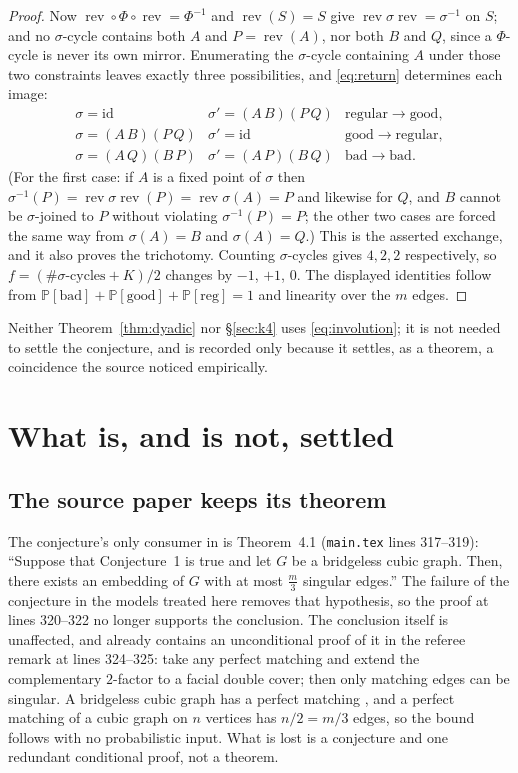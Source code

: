 \documentclass[11pt]{amsart}
\begin{document}
\begin{proof}
Now $\operatorname{rev}\circ\Phi\circ\operatorname{rev}=\Phi^{-1}$ and
$\operatorname{rev}(S)=S$ give
$\operatorname{rev}\sigma\operatorname{rev}=\sigma^{-1}$ on $S$; and no
$\sigma$-cycle contains both $A$ and $P=\operatorname{rev}(A)$, nor both $B$
and $Q$, since a $\Phi$-cycle is never its own mirror. Enumerating the
$\sigma$-cycle containing $A$ under those two constraints leaves exactly three
possibilities, and \eqref{eq:return} determines each image:
\[
\begin{array}{lll}
 \sigma=\mathrm{id}       & \sigma'=(A\,B)(P\,Q) & \text{regular}\to\text{good},\\
 \sigma=(A\,B)(P\,Q)     & \sigma'=\mathrm{id}   & \text{good}\to\text{regular},\\
 \sigma=(A\,Q)(B\,P)     & \sigma'=(A\,P)(B\,Q) & \text{bad}\to\text{bad}.
\end{array}
\]
(For the first case: if $A$ is a fixed point of $\sigma$ then
$\sigma^{-1}(P)=\operatorname{rev}\sigma\operatorname{rev}(P)
=\operatorname{rev}\sigma(A)=P$ and likewise for $Q$, and $B$ cannot be
$\sigma$-joined to $P$ without violating $\sigma^{-1}(P)=P$; the other two
cases are forced the same way from $\sigma(A)=B$ and $\sigma(A)=Q$.) This is
the asserted exchange, and it also proves the trichotomy. Counting
$\sigma$-cycles gives $4,2,2$ respectively, so
$f=(\#\sigma\text{-cycles}+K)/2$ changes by $-1$, $+1$, $0$. The displayed
identities follow from
$\mathbb{P}[\mathrm{bad}]+\mathbb{P}[\mathrm{good}]+\mathbb{P}[\mathrm{reg}]=1$
and linearity over the $m$ edges.
\end{proof}

Neither Theorem~\ref{thm:dyadic} nor \S\ref{sec:k4} uses
\eqref{eq:involution}; it is not needed to settle the conjecture, and is
recorded only because it settles, as a theorem, a coincidence the source
noticed empirically.

\section{What is, and is not, settled}\label{sec:scope}

\subsection*{The source paper keeps its theorem}
The conjecture's only consumer in \cite{GS} is Theorem~4.1
(\texttt{main.tex} lines 317--319): ``Suppose that Conjecture~1 is true and
let $G$ be a bridgeless cubic graph. Then, there exists an embedding of $G$
with at most $\frac{m}{3}$ singular edges.'' The failure of the conjecture in
the models treated here removes that hypothesis, so the proof at lines
320--322 no longer supports the conclusion. The conclusion itself is unaffected, and \cite{GS} already contains
an unconditional proof of it in the referee remark at lines 324--325: take any
perfect matching and extend the complementary $2$-factor to a facial double
cover; then only matching edges can be singular. A bridgeless cubic graph has
a perfect matching \cite{Pet}, and a perfect matching of a cubic graph on $n$
vertices has $n/2=m/3$ edges, so the bound follows with no probabilistic
input. What is lost is a conjecture and one redundant conditional proof, not a
theorem.
\end{document}
